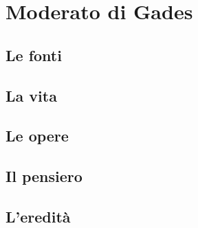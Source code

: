 \chapter{Moderato di Gades}

\section{Le fonti}

\section{La vita}

\section{Le opere}

\section{Il pensiero}

\section{L'eredità}
